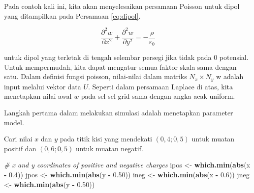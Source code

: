 \documentclass[]{book}
\newenvironment{Shaded}{\begin{snugshade}}{\end{snugshade}}
\newcommand{\CommentTok}[1]{\textcolor[rgb]{0.56,0.35,0.01}{\textit{#1}}}
\newcommand{\DataTypeTok}[1]{\textcolor[rgb]{0.13,0.29,0.53}{#1}}
\newcommand{\DecValTok}[1]{\textcolor[rgb]{0.00,0.00,0.81}{#1}}
\newcommand{\FloatTok}[1]{\textcolor[rgb]{0.00,0.00,0.81}{#1}}
\newcommand{\KeywordTok}[1]{\textcolor[rgb]{0.13,0.29,0.53}{\textbf{#1}}}
\newcommand{\NormalTok}[1]{#1}
\newcommand{\OperatorTok}[1]{\textcolor[rgb]{0.81,0.36,0.00}{\textbf{#1}}}
\newcommand{\StringTok}[1]{\textcolor[rgb]{0.31,0.60,0.02}{#1}}
\theoremstyle{definition}
\theoremstyle{definition}
\theoremstyle{definition}
\theoremstyle{remark}
\begin{document}
Pada contoh kali ini, kita akan menyelesaikan persamaan Poisson untuk dipol yang ditampilkan pada Persamaan \eqref{eq:dipol}.

\begin{equation}
\frac{\partial^2w}{\partial x^2}+\frac{\partial^2w}{\partial y^2}=-\frac{\rho}{\varepsilon_0}
  \label{eq:dipol}
\end{equation}

untuk dipol yang terletak di tengah selembar persegi jika tidak pada 0 potensial. Untuk mempermudah, kita dapat mengatur semua faktor skala sama dengan satu. Dalam definisi fungsi poisson, nilai-nilai dalam matriks \(N_x \times N_y\) w adalah input melalui vektor data \(U\). Seperti dalam persamaan Laplace di atas, kita menetapkan nilai awal \(w\) pada sel-sel grid sama dengan angka acak uniform.

Langkah pertama dalam melakukan simulasi adalah menetapkan parameter model.

\begin{Shaded}
\end{Shaded}

Cari nilai \(x\) dan \(y\) pada titik kisi yang mendekati \(\left(0,4;0,5\right)\) untuk muatan positif dan \(\left(0,6;0,5\right)\) untuk muatan negatif.

\begin{Shaded}
\begin{Highlighting}[]
\CommentTok{# x and y coordinates of positive and negative charges}
\NormalTok{ipos <-}\StringTok{ }\KeywordTok{which.min}\NormalTok{(}\KeywordTok{abs}\NormalTok{(x }\OperatorTok{-}\StringTok{ }\FloatTok{0.4}\NormalTok{))}
\NormalTok{jpos <-}\StringTok{ }\KeywordTok{which.min}\NormalTok{(}\KeywordTok{abs}\NormalTok{(y }\OperatorTok{-}\StringTok{ }\FloatTok{0.50}\NormalTok{))}
\NormalTok{ineg <-}\StringTok{ }\KeywordTok{which.min}\NormalTok{(}\KeywordTok{abs}\NormalTok{(x }\OperatorTok{-}\StringTok{ }\FloatTok{0.6}\NormalTok{))}
\NormalTok{jneg <-}\StringTok{ }\KeywordTok{which.min}\NormalTok{(}\KeywordTok{abs}\NormalTok{(y }\OperatorTok{-}\StringTok{ }\FloatTok{0.50}\NormalTok{))}
\end{Highlighting}
\end{Shaded}
\end{document}
